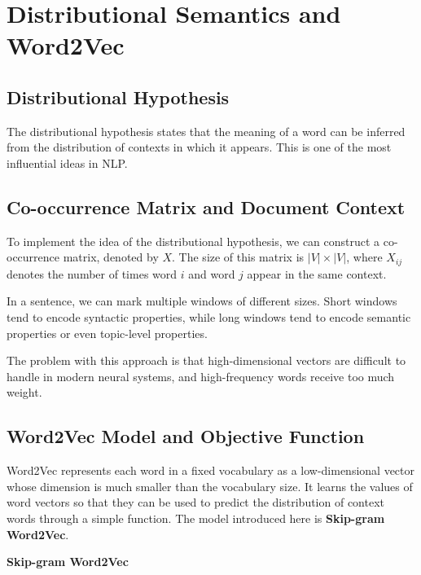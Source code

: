 \documentclass[
  a4paper,
  10pt]{article}
\begin{document}
\section{Distributional Semantics and
Word2Vec}\label{distributional-semantics-and-word2vec}

\subsection{Distributional Hypothesis}\label{distributional-hypothesis}

The distributional hypothesis states that the meaning of a word can be
inferred from the distribution of contexts in which it appears. This is
one of the most influential ideas in NLP.

\subsection{Co-occurrence Matrix and Document
Context}\label{co-occurrence-matrix-and-document-context}

To implement the idea of the distributional hypothesis, we can construct
a co-occurrence matrix, denoted by \(X\). The size of this matrix is
\(\lvert V\rvert\times\lvert V\rvert\), where \(X_{ij}\) denotes the
number of times word \(i\) and word \(j\) appear in the same context.

In a sentence, we can mark multiple windows of different sizes. Short
windows tend to encode syntactic properties, while long windows tend to
encode semantic properties or even topic-level properties.

The problem with this approach is that high-dimensional vectors are
difficult to handle in modern neural systems, and high-frequency words
receive too much weight.

\subsection{Word2Vec Model and Objective
Function}\label{word2vec-model-and-objective-function}

Word2Vec represents each word in a fixed vocabulary as a low-dimensional
vector whose dimension is much smaller than the vocabulary size. It
learns the values of word vectors so that they can be used to predict
the distribution of context words through a simple function. The model
introduced here is \textbf{Skip-gram Word2Vec}.

\textbf{Skip-gram Word2Vec}
\end{document}
